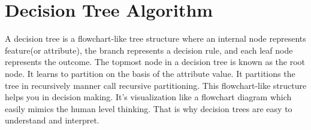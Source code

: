 \documentclass[11pt]{article}
\begin{document}
    \section{Decision Tree Algorithm}\label{decision-tree-algorithm}

A decision tree is a flowchart-like tree structure where an internal
node represents feature(or attribute), the branch represents a decision
rule, and each leaf node represents the outcome. The topmost node in a
decision tree is known as the root node. It learns to partition on the
basis of the attribute value. It partitions the tree in recursively
manner call recursive partitioning. This flowchart-like structure helps
you in decision making. It's visualization like a flowchart diagram
which easily mimics the human level thinking. That is why decision trees
are easy to understand and interpret.
\end{document}

